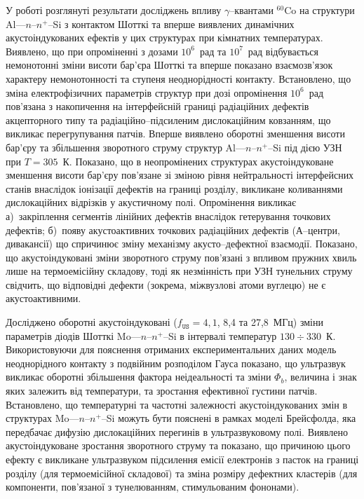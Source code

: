 У  роботі розглянуті результати досліджень
впливу $\gamma$--квантами $^{60}$Co на структури Al---$n$--$n^+$--Si з контактом Шотткі та
вперше виявлених динамічних акустоіндукованих ефектів у цих структурах при кімнатних температурах.
Виявлено, що при
опроміненні  з дозами $10^6$~рад та $10^7$~рад відбувається
немонотонні зміни висоти бар'єра Шотткі та вперше показано взаємозв'язок характеру немонотонності та ступеня неоднорідності контакту.
Встановлено, що зміна електрофізичних параметрів структур при дозі опромінення $10^6$~рад
пов'язана з накопичення на інтерфейсній границі радіаційних дефектів акцепторного типу та радіаційно--підсиленим дислокаційним ковзанням, що викликає перегрупування патчів.
Вперше виявлено оборотні зменшення висоти бар'єру та збільшення зворотного струму  структур Al---$n$--$n^+$--Si під дією УЗН при $T=305$~К.
Показано, що в неопромінених структурах акустоіндуковане зменшення висоти бар'єру пов'язане зі зміною рівня нейтральності інтерфейсних станів
внаслідок іонізації дефектів на границі розділу, викликане коливаннями дислокаційних відрізків у акустичному полі.
Опромінення викликає
а)~закріплення сегментів лінійних дефектів внаслідок гетерування точкових дефектів;
б)~появу акустоактивних точкових радіаційних дефектів (А--центри, дивакансії)
що спричинює зміну механізму акусто--дефектної взаємодії.
Показано, що акустоіндуковані зміни зворотного струму пов'язані з впливом пружних хвиль лише на термоемісійну складову,
тоді як незмінність при УЗН тунельних струму свідчить, що відповідні дефекти (зокрема, міжвузлові атоми вуглецю) не є акустоактивними.


Досліджено оборотні акустоіндуковані ($f_\mathtt{US}=4,1$, 8,4 та 27,8~МГц) зміни параметрів діодів Шотткі Mo---$n$--$n^+$--Si в інтервалі температур $130\div330$~К.
Використовуючи для пояснення отриманих експериментальних даних модель неоднорідного контакту з подвійним розподілом Гауса
показано, що ультразвук викликає оборотні збільшення фактора неідеальності та зміни $\Phi_{b}$,
величина і знак яких залежить від температури,
та зростання ефективної густини патчів.
Встановлено, що температурні та частотні залежності акустоіндукованих змін в структурах
 Mo---$n$--$n^+$--Si  можуть бути пояснені в рамках моделі Брейсфолда,
яка передбачає дифузію дислокаційних перегинів в ультразвуковому полі.
Виявлено акустоіндуковане зростання зворотного струму та показано, що причиною цього ефекту є викликане ультразвуком підсилення емісії електронів з пасток на границі розділу (для термоемісійної складової) та зміна розміру дефектних кластерів (для компоненти, пов'язаної з тунелюванням, стимульованим фононами).

